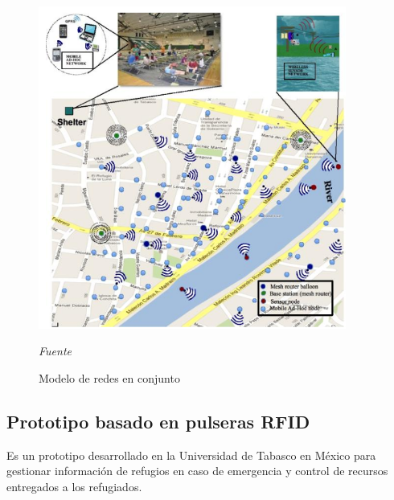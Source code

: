\documentclass[11pt,openany]{book}
\begin{document}
	\newpage
	
	\begin{figure}[htb]
			\centering
			\includegraphics[width=0.9\textwidth]{imagenes/redes.PNG}
			\caption{Modelo de redes en conjunto}
			\textsl{Fuente }\cite{Wister2013}
			\label{modelo_de_redes}
	\end{figure}

	\subsection{Prototipo basado en pulseras RFID \cite{Wister2015}}
	Es un prototipo desarrollado en la Universidad de Tabasco en México para gestionar información de refugios en caso de emergencia y control de recursos entregados a los refugiados.\\
\end{document}
